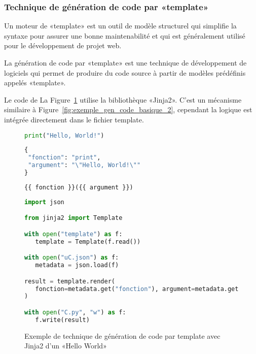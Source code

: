 \subsubsection{Technique de génération de code par «template»}

Un moteur de «template» est un outil de modèle structurel qui simplifie la syntaxe pour assurer une bonne maintenabilité et qui est généralement utilisé pour le développement de projet web.

La génération de code par «template» est une technique de développement de logiciels qui permet de produire du code source à partir de modèles prédéfinis appelés «template».

Le code de La Figure~\ref{fig:exemple_gen_code_basique_template} utilise la bibliothèque «Jinja2». C'est un mécanisme similaire à Figure~\ref{fig:exemple_gen_code_basique_2}, cependant la logique est intégrée directement dans le fichier template.

\begin{figure}
\begin{lstlisting}[language=Python, upquote=true, caption={C - fichier C.py de Figure~\ref{fig:exemple_gen_code_basique_template}}, label={lst:gen_code_template_c}]
print("Hello, World!")
\end{lstlisting}

\begin{lstlisting}[language=Python, upquote=true, caption={µ$_C$ - fichier uC.json de Figure~\ref{fig:exemple_gen_code_basique_template}}, label={lst:gen_code_template_uc}]
{
 "fonction": "print",
 "argument": "\"Hello, World!\""
}
\end{lstlisting}

\begin{lstlisting}[language=Python, upquote=true, caption={template - fichier template de Figure~\ref{fig:exemple_gen_code_basique_template}}, label={lst:gen_code_template_template}]
{{ fonction }}({{ argument }})
\end{lstlisting}

\begin{lstlisting}[language=Python, upquote=true, caption={M(µ$_C$) de Figure~\ref{fig:exemple_gen_code_basique_template}}, label={lst:gen_code_template_m}]
import json

from jinja2 import Template

with open("template") as f:
   template = Template(f.read())

with open("uC.json") as f:
   metadata = json.load(f)

result = template.render(
   fonction=metadata.get("fonction"), argument=metadata.get("argument")
)

with open("C.py", "w") as f:
   f.write(result)
\end{lstlisting}
\caption{Exemple de technique de génération de code par template avec Jinja2 d'un «Hello World»}
\label{fig:exemple_gen_code_basique_template}
\end{figure}

